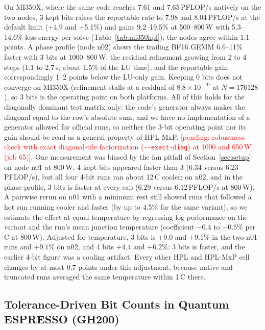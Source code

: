 \documentclass[conference]{IEEEtran}
\newcommand{\W}{\,W}
\newcommand{\ee}[2]{#1{\times}10^{#2}}  %
\newcommand{\pct}{\%}
\newcommand{\pending}[1]{\textcolor{red}{[pending: #1]}}
\begin{document}
On MI350X, where the same code reaches 7.61 and 7.65\,PFLOP/s natively on the two nodes, 3 kept bits raises the
reportable rate to 7.98 and 8.04\,PFLOP/s at the default limit (+4.9 and +5.1\pct) and gains 9.2--19.5\pct{} at
500--800\W{} with 5.3--14.6\pct{} less energy per solve (Table~\ref{tab:mi350hpl}); the nodes agree within 1.1 points.
A phase profile (node n02) shows the trailing BF16 GEMM 6.6--11\pct{} faster with 3 bits at 1000--800\W, the residual refinement growing
from 2 to 4 steps (1.1 to 2.7\,s, about 1.5\pct{} of the LU time), and the reportable gain correspondingly 1--2 points below
the LU-only gain. Keeping 0 bits does not converge on MI350X (refinement stalls at a residual of $\ee{8.8}{-10}$ at
$N=176128$), so 3 bits is the operating point on both platforms. All of this holds for the diagonally dominant test
matrix only: the code's generator always makes the diagonal equal to the row's absolute sum, and we have no
implementation of a generator allowed for official runs, so neither the 3-bit operating point nor its gain should be
read as a general property of HPL-MxP. \pending{robustness check with exact diagonal-tile factorization
(\texttt{-{}-exact-diag}) at 1000 and 650\W{} (job 65)}. One measurement was biased by the fan pitfall of
Section~\ref{sec:setup}: on node n01 at 800\W, 4 kept bits appeared faster than 3 (6.34 versus 6.23\,PFLOP/s), but all four 4-bit
runs ran about 12\,\textdegree C cooler; on n02, and in the phase profile, 3 bits is faster at every cap
(6.29 versus 6.12\,PFLOP/s at 800\W). A pairwise rerun on n01 with a minimum rest still showed runs that followed a hot
run running cooler and faster (by up to 4.5\pct{} for the same variant), so we estimate the effect at equal temperature by
regressing log performance on the variant and the run's mean junction temperature (coefficient $-0.4$ to $-0.5\pct$ per
\textdegree C at 800\W). Adjusted for temperature, 3 bits is $+9.0$ and $+9.1\pct$ in the two n01 runs and $+9.1\pct$ on
n02, and 4 bits $+4.4$ and $+6.2\pct$: 3 bits is faster, and the earlier 4-bit figure was a cooling artifact. Every
other HPL and HPL-MxP cell changes by at most 0.7 points under this adjustment, because native and truncated runs
averaged the same temperature within 1\,\textdegree C there.


\subsection{Tolerance-Driven Bit Counts in Quantum ESPRESSO (GH200)}\label{sec:adaptive}
\end{document}
